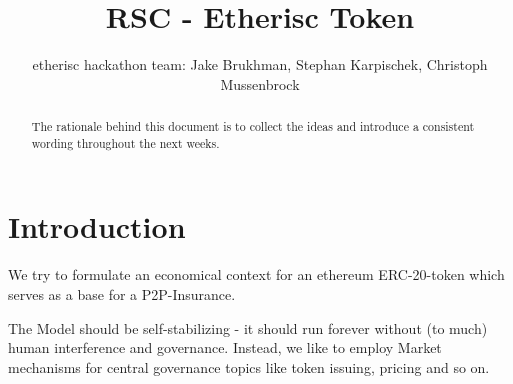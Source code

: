 \documentclass[runningheads,a4paper]{llncs}
\begin{document}
\mainmatter 

\title{RSC - Etherisc Token}


\author{etherisc hackathon team: Jake Brukhman, Stephan Karpischek, Christoph Mussenbrock}



\tocauthor{{}}

\maketitle

\begin{abstract}
The rationale behind this document is to collect the ideas and introduce a consistent wording throughout the next weeks.
\end{abstract}

\medskip

\begingroup
\let\clearpage\relax
\tableofcontents
{}
\endgroup

\medskip
\medskip

\section*{Introduction}

We try to formulate an economical context for an ethereum ERC-20-token which serves as a base for a 
P2P-Insurance. 

The Model should be self-stabilizing - it should run forever without (to much) 
human interference and governance. Instead, we like to employ Market mechanisms for
central governance topics like token issuing, pricing and so on.
\end{document}
